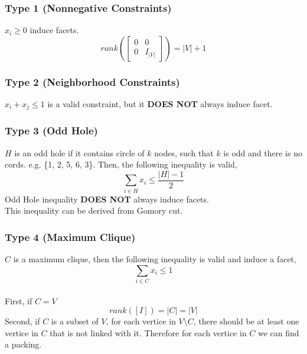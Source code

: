 				\subsubsection{Type 1 (Nonnegative Constraints)}
					$x_i \ge 0$ induce facets.\\
					\begin{equation}
						rank\left(\left[\begin{matrix}0 & 0 \\ 0 & I_{|V|}\end{matrix}\right]\right) = |V| + 1 
					\end{equation}

				\subsubsection{Type 2 (Neighborhood Constraints)}
					$x_i + x_j \le 1$ is a valid constraint, but it \textbf{DOES NOT} always induce facet.

				\subsubsection{Type 3 (Odd Hole)}
					$H$ is an odd hole if it contains circle of $k$ nodes, such that $k$ is odd and there is no cords. e.g. \{1, 2, 5, 6, 3\}. Then, the following inequality is valid,
					\begin{equation}
						\sum_{i\in H}x_i\le \frac{|H|-1}2 
					\end{equation}
					Odd Hole inequality \textbf{DOES NOT} always induce facets.\\
					This inequality can be derived from Gomory cut.

				\subsubsection{Type 4 (Maximum Clique)}
					$C$ is a maximum clique, then the following inequality is valid and induce a facet,
					\begin{equation}
						\sum_{i\in C} x_i \le 1 
					\end{equation}
					\\
						First, if $C=V$
						\begin{equation}
							rank\left(\left[I\right]\right) = |C| = |V| 			
						\end{equation}
						Second, if $C$ is a subset of $V$, for each vertice in $V \setminus C$, there should be at least one vertice in $C$ that is not linked with it. Therefore for each vertice in $C$ we can find a packing.

